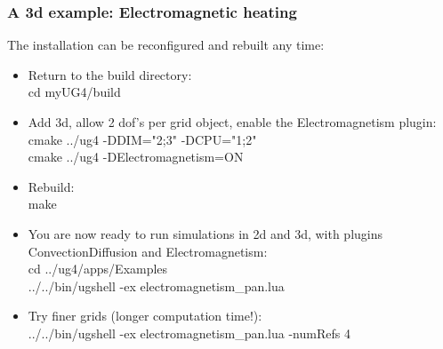 \documentclass[xcolor=dvipsnames]{beamer}
\begin{document}
\begin {frame} [t]
\frametitle {A 3d example: Electromagnetic heating}
The installation can be reconfigured and rebuilt any time:
\begin {itemize}
	\item Return to the build directory: \\
		{\color{blue} cd myUG4/build}
	\pause
	\item Add 3d, allow 2 dof's per grid object, enable the Electromagnetism plugin: \\
		{\color{blue} cmake ../ug4 -DDIM="2;3" -DCPU="1;2"} \\
		{\color{blue} cmake ../ug4 -DElectromagnetism=ON}
	\pause
	\item Rebuild: \\
		{\color{blue} make} \\
	\pause
	\item You are now ready to run simulations in 2d and 3d, with plugins ConvectionDiffusion
		and Electromagnetism: \\
		{\color{blue} cd ../ug4/apps/Examples} \\
		{\color{blue} ../../bin/ugshell -ex electromagnetism\_pan.lua}
	\pause
	\item Try finer grids (longer computation time!): \\
		{\color{blue} ../../bin/ugshell -ex electromagnetism\_pan.lua -numRefs 4}
\end {itemize}
\end {frame}
\end{document}
